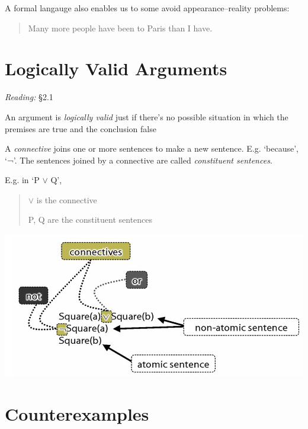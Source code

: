 \documentclass[12pt]{extarticle}
\begin{document}
\begin{multicols*}{3}
\begin{quote}
\end{quote}
 
A formal langauge also enables us to some avoid appearance--reality problems:
 
\begin{quote}
 
Many more people have been to Paris than I have.
 
\end{quote}
 
 
 
\section{Logically Valid Arguments}
 
\emph{Reading:} §2.1
 
An argument is \emph{logically valid} just if there’s no possible situation in which the premises are true and the conclusion false
 
A \emph{connective} joins one or more sentences to make a new sentence. E.g. ‘because’, ‘¬’. The sentences joined by a connective are called \emph{constituent sentences}.
 
E.g. in ‘P $\lor{}$ Q’,
 
\begin{quote}
 
$\lor{}$ is the connective
 
P, Q are the constituent sentences
 
\end{quote}
 
\begin{center}
\includegraphics[scale=0.3]{img/terminology_more.png}
\end{center}
 
 
\section{Counterexamples}
 

\end{multicols*}
\end{document}
